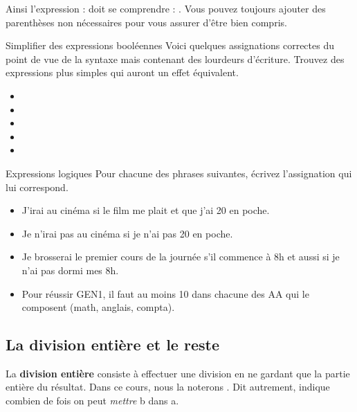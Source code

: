 			Ainsi l'expression : 
			doit se comprendre : .
			Vous pouvez toujours ajouter des parenthèses non nécessaires
			pour vous assurer d'être bien compris.
			 
			\begin{Exercice}{Simplifier des expressions booléennes}
				Voici quelques assignations correctes du point de vue de la
				syntaxe mais contenant des lourdeurs d’écriture.
				Trouvez des expressions plus simples
				qui auront un effet équivalent.
				\begin{itemize}
					\item {}
					\item {}
					\item {}
					\item {}
					\item {}
				\end{itemize}		
			\end{Exercice}
		
			\begin{Exercice}{Expressions logiques}
				Pour chacune des phrases suivantes,
				écrivez l'assignation qui lui correspond.
				\begin{itemize}
				\item J’irai au cinéma si le film me plait et que j’ai 20\texteuro{} en poche.
				\item Je n’irai pas au cinéma si je n’ai pas 20\texteuro{} en poche.
				\item Je brosserai le premier cours de la journée s’il commence à 8h et aussi si je n’ai pas dormi mes 8h.
				\item Pour réussir GEN1, il faut au moins 10 dans chacune des AA qui le composent (math, anglais, compta).	
				\end{itemize}
			\end{Exercice}
			
		\subsection{La division entière et le reste}
		
			La \textbf{division entière} consiste à effectuer une division
			en ne gardant que la partie entière du résultat.
			Dans ce cours, nous la noterons .
			Dit autrement, 
			indique combien de fois on peut \emph{mettre} b dans a.
			
